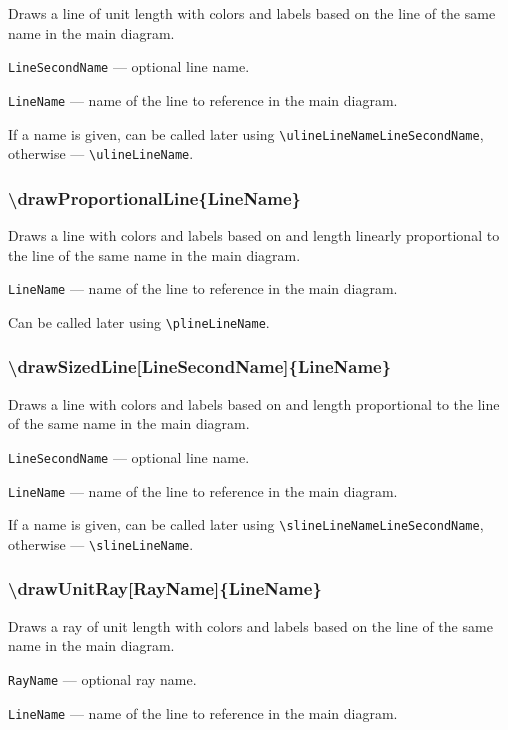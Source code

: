 \documentclass{ltxdoc}
\begin{document}
	Draws a line of unit length with colors and labels based on the line of the same name in the main diagram.

	\texttt{LineSecondName} — optional line name.
	
	\texttt{LineName} — name of the line to reference in the main diagram. 

	If a name is given, can be called later using \texttt{\textbackslash ulineLineNameLineSecondName}, otherwise — \texttt{\textbackslash ulineLineName}. 

\subsubsection{\textbackslash drawProportionalLine\{LineName\}}

	Draws a line with colors and labels based on and length linearly proportional to the line of the same name in the main diagram.

	\texttt{LineName} — name of the line to reference in the main diagram. 
	
	Can be called later using \texttt{\textbackslash plineLineName}.


\subsubsection{\textbackslash drawSizedLine[LineSecondName]\{LineName\}}

	Draws a line with colors and labels based on and length proportional to the line of the same name in the main diagram.

	\texttt{LineSecondName} — optional line name. 
	
	\texttt{LineName} — name of the line to reference in the main diagram. 
	
	If a name is given, can be called later using \texttt{\textbackslash slineLineNameLineSecondName}, otherwise — \texttt{\textbackslash slineLineName}. 

\subsubsection{\textbackslash drawUnitRay[RayName]\{LineName\}}

	Draws a ray of unit length with colors and labels based on the line of the same name in the main diagram.

	\texttt{RayName} — optional ray name.
	
	\texttt{LineName} — name of the line to reference in the main diagram. 
\end{document}
